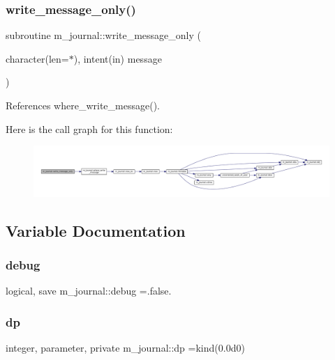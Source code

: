 \subsubsection{\texorpdfstring{write\+\_\+message\+\_\+only()}{write\_message\_only()}}
{\footnotesize\ttfamily subroutine m\+\_\+journal\+::write\+\_\+message\+\_\+only (\begin{DoxyParamCaption}\item[{character(len=$\ast$), intent(in)}]{message }\end{DoxyParamCaption})\hspace{0.3cm}{\ttfamily [private]}}



References where\+\_\+write\+\_\+message().

Here is the call graph for this function\+:\nopagebreak
\begin{figure}[H]
\begin{center}
\leavevmode
\includegraphics[width=350pt]{namespacem__journal_aa86511a7c388f9286c282f6fa933ab58_cgraph}
\end{center}
\end{figure}


\subsection{Variable Documentation}
\mbox{\label{namespacem__journal_a6184fbcebdfa06f0a45ce4c699189b53}} 
\subsubsection{\texorpdfstring{debug}{debug}}
{\footnotesize\ttfamily logical, save m\+\_\+journal\+::debug =.false.\hspace{0.3cm}{\ttfamily [private]}}

\mbox{\label{namespacem__journal_aaae0522a70bb76a85ea800670d5fec5f}} 
\subsubsection{\texorpdfstring{dp}{dp}}
{\footnotesize\ttfamily integer, parameter, private m\+\_\+journal\+::dp =kind(0.\+0d0)\hspace{0.3cm}{\ttfamily [private]}}


